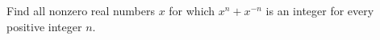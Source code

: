 Find all nonzero real numbers $x$ for which $x^n+x^{-n}$ is an integer for every positive integer $n$.
